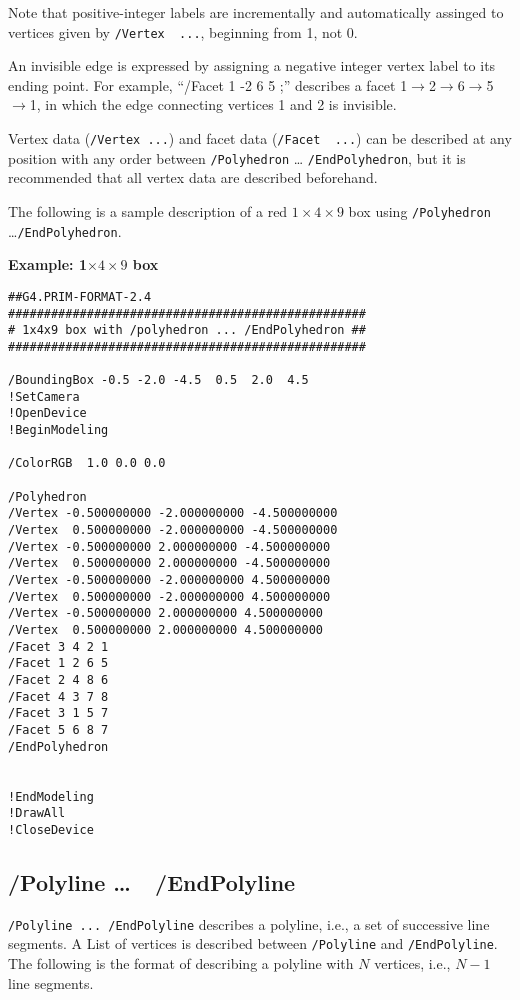 Note that positive-integer labels are incrementally and automatically
assinged to vertices given by  \verb+/Vertex  ...+,   
beginning from 1, not 0.

An invisible edge is expressed by assigning a negative 
integer vertex label to its ending point.
For example, ``/Facet 1 -2 6 5 ;'' describes a facet
1$\rightarrow$2$\rightarrow$6$\rightarrow$5$\rightarrow$1,
in which the edge connecting vertices 1 and 2 is invisible.

Vertex data (\verb+/Vertex ...+) and facet data (\verb+/Facet  ...+)
can be described at any position with any order
between \verb+/Polyhedron+ \ldots{} \verb+/EndPolyhedron+, 
but it is recommended that all vertex data are described beforehand.  

The following is a sample description of a   
red $1\times{}4\times{}9$ box using
\verb+/Polyhedron+ \ldots{}\verb+/EndPolyhedron+. 
\vspace{.20in}

\noindent  
{\bf{}Example: 1$\times{}4\times{}9$ box}

\begin{verbatim}
##G4.PRIM-FORMAT-2.4
##################################################
# 1x4x9 box with /polyhedron ... /EndPolyhedron ##
##################################################

/BoundingBox -0.5 -2.0 -4.5  0.5  2.0  4.5
!SetCamera
!OpenDevice 
!BeginModeling

/ColorRGB  1.0 0.0 0.0

/Polyhedron
/Vertex -0.500000000 -2.000000000 -4.500000000
/Vertex  0.500000000 -2.000000000 -4.500000000
/Vertex -0.500000000 2.000000000 -4.500000000
/Vertex  0.500000000 2.000000000 -4.500000000
/Vertex -0.500000000 -2.000000000 4.500000000
/Vertex  0.500000000 -2.000000000 4.500000000
/Vertex -0.500000000 2.000000000 4.500000000
/Vertex  0.500000000 2.000000000 4.500000000
/Facet 3 4 2 1 
/Facet 1 2 6 5 
/Facet 2 4 8 6 
/Facet 4 3 7 8 
/Facet 3 1 5 7 
/Facet 5 6 8 7 
/EndPolyhedron


!EndModeling
!DrawAll 
!CloseDevice 
\end{verbatim}



\subsection{/Polyline \ldots\ \ /EndPolyline}  
\verb+/Polyline ... /EndPolyline+ describes a polyline, i.e.,  
a set of successive line segments.  
A List of vertices is described between
\verb+/Polyline+ and \verb+/EndPolyline+.
The following is the format of describing a polyline with
$N$ vertices, i.e., $N-1$ line segments.
\vspace{.20in}

